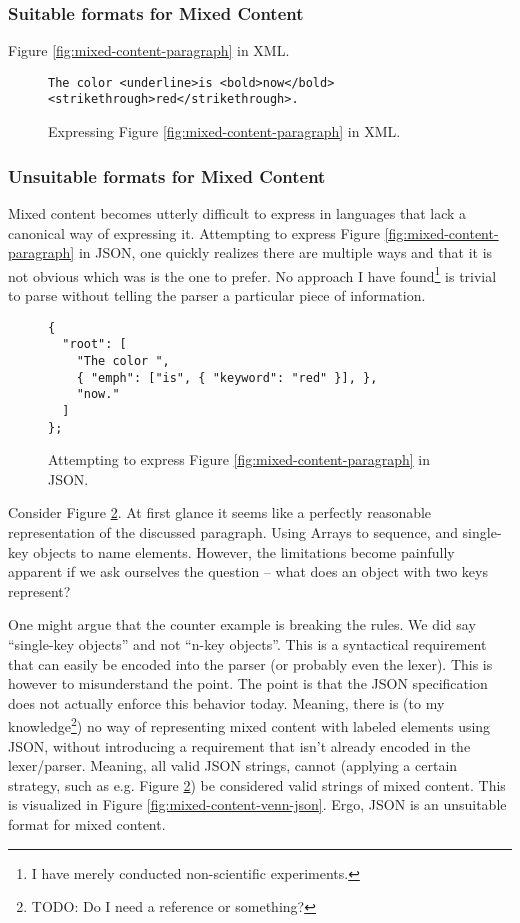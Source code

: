 \documentclass{scrreprt}
\begin{document}
\subsubsection{Suitable formats for Mixed Content}
Figure \ref{fig:mixed-content-paragraph} in XML.


\begin{figure}[h]
\begin{lstlisting}
The color <underline>is <bold>now</bold> <strikethrough>red</strikethrough>.
\end{lstlisting}
\caption{Expressing Figure \ref{fig:mixed-content-paragraph} in XML.}
\label{fig:mixed-content-xml}
\end{figure}



\subsubsection{Unsuitable formats for Mixed Content}
Mixed content becomes utterly difficult to express in languages that lack a canonical way of expressing it. Attempting to express Figure \ref{fig:mixed-content-paragraph} in JSON, one quickly realizes there are multiple ways and that it is not obvious which was is the one to prefer. No approach I have found\footnote{I have merely conducted non-scientific experiments.} is trivial to parse without telling the parser a particular piece of information.

\begin{figure}[h]
\begin{lstlisting}
{
  "root": [
    "The color ",
    { "emph": ["is", { "keyword": "red" }], },
    "now."
  ]
};
\end{lstlisting}
\caption{Attempting to express Figure \ref{fig:mixed-content-paragraph} in JSON.}
\label{fig:mixed-content-json}
\end{figure}


Consider Figure \ref{fig:mixed-content-json}. At first glance it seems like a perfectly reasonable representation of the discussed paragraph. Using Arrays to sequence, and single-key objects to name elements. However, the limitations become painfully apparent if we ask ourselves the question -- what does an object with two keys represent?

One might argue that the counter example is breaking the rules. We did say ``single-key objects'' and not ``n-key objects''. This is a syntactical requirement that can easily be encoded into the parser (or probably even the lexer). This is however to misunderstand the point. The point is that the JSON specification does not actually enforce this behavior today. Meaning, there is (to my knowledge\footnote{TODO: Do I need a reference or something?}) no way of representing mixed content with labeled elements using JSON, without introducing a requirement that isn't already encoded in the lexer/parser. Meaning, all valid JSON strings, cannot (applying a certain strategy, such as e.g. Figure \ref{fig:mixed-content-json}) be considered valid strings of mixed content. This is visualized in Figure \ref{fig:mixed-content-venn-json}. Ergo, JSON is an unsuitable format for mixed content.
\end{document}

